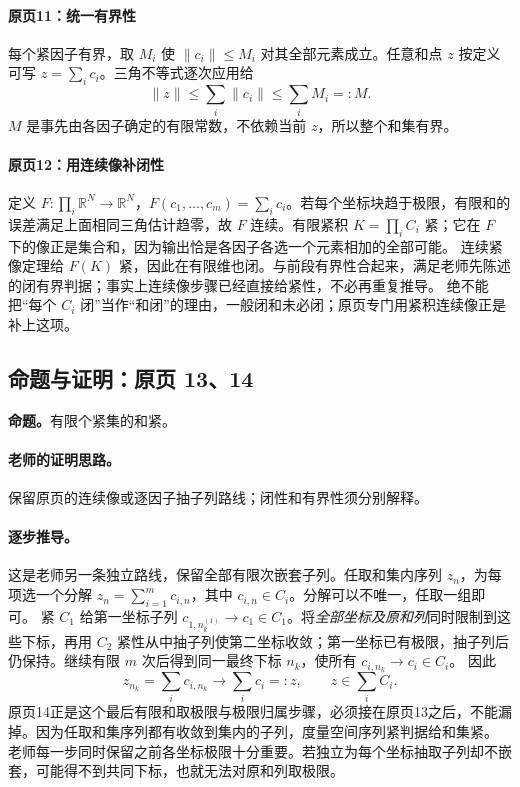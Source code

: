 \documentclass[11pt,a4paper]{article}
\newcommand{\R}{\mathbb{R}}\newcommand{\N}{\mathbb{N}}
\theoremstyle{definition}\newtheorem{definition}{定义}\newtheorem{example}{例}
\begin{document}
\paragraph{原页11：统一有界性}
每个紧因子有界，取 $M_i$ 使 $\|c_i\|\le M_i$ 对其全部元素成立。任意和点 $z$ 按定义可写 $z=\sum_i c_i$。三角不等式逐次应用给
\[\|z\|\le\sum_i\|c_i\|\le\sum_iM_i=:M.\]
$M$ 是事先由各因子确定的有限常数，不依赖当前 $z$，所以整个和集有界。
\paragraph{原页12：用连续像补闭性}
定义 $F:\prod_i\R^N\to\R^N$，$F(c_1,\ldots,c_m)=\sum_i c_i$。若每个坐标块趋于极限，有限和的误差满足上面相同三角估计趋零，故 $F$ 连续。有限紧积 $K=\prod_iC_i$ 紧；它在 $F$ 下的像正是集合和，因为输出恰是各因子各选一个元素相加的全部可能。
连续紧像定理给 $F(K)$ 紧，因此在有限维也闭。与前段有界性合起来，满足老师先陈述的闭有界判据；事实上连续像步骤已经直接给紧性，不必再重复推导。
绝不能把“每个 $C_i$ 闭”当作“和闭”的理由，一般闭和未必闭；原页专门用紧积连续像正是补上这项。


\subsection{命题与证明：原页 13、14}

\textbf{命题。}有限个紧集的和紧。

\paragraph{老师的证明思路。}保留原页的连续像或逐因子抽子列路线；闭性和有界性须分别解释。

\paragraph{逐步推导。}
这是老师另一条独立路线，保留全部有限次嵌套子列。任取和集内序列 $z_n$，为每项选一个分解 $z_n=\sum_{i=1}^m c_{i,n}$，其中 $c_{i,n}\in C_i$。分解可以不唯一，任取一组即可。
紧 $C_1$ 给第一坐标子列 $c_{1,n^{(1)}_k}\to c_1\in C_1$。将\emph{全部坐标及原和列}同时限制到这些下标，再用 $C_2$ 紧性从中抽子列使第二坐标收敛；第一坐标已有极限，抽子列后仍保持。继续有限 $m$ 次后得到同一最终下标 $n_k$，使所有 $c_{i,n_k}\to c_i\in C_i$。
因此
\[z_{n_k}=\sum_i c_{i,n_k}\longrightarrow\sum_i c_i=:z,\qquad z\in\sum_i C_i.\]
原页14正是这个最后有限和取极限与极限归属步骤，必须接在原页13之后，不能漏掉。因为任取和集序列都有收敛到集内的子列，度量空间序列紧判据给和集紧。
老师每一步同时保留之前各坐标极限十分重要。若独立为每个坐标抽取子列却不嵌套，可能得不到共同下标，也就无法对原和列取极限。
\end{document}
